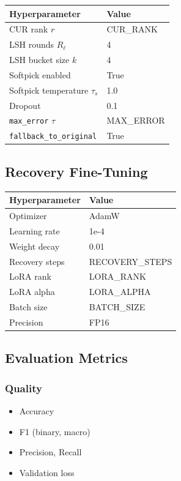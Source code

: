 \begin{table}[H]
\centering
\small
\begin{tabular}{ll}
\toprule
\textbf{Hyperparameter} & \textbf{Value} \\
\midrule
CUR rank $r$ & {{CUR\_RANK}} \\
LSH rounds $R_\ell$ & 4 \\
LSH bucket size $k$ & 4 \\
Softpick enabled & True \\
Softpick temperature $\tau_s$ & 1.0 \\
Dropout & 0.1 \\
\texttt{max\_error} $\tau$ & {{MAX\_ERROR}} \\
\texttt{fallback\_to\_original} & True \\
\bottomrule
\end{tabular}
\end{table}

\subsection{Recovery Fine-Tuning}

\begin{table}[H]
\centering
\small
\begin{tabular}{ll}
\toprule
\textbf{Hyperparameter} & \textbf{Value} \\
\midrule
Optimizer & AdamW \\
Learning rate & 1e-4 \\
Weight decay & 0.01 \\
Recovery steps & {{RECOVERY\_STEPS}} \\
LoRA rank & {{LORA\_RANK}} \\
LoRA alpha & {{LORA\_ALPHA}} \\
Batch size & {{BATCH\_SIZE}} \\
Precision & FP16 \\
\bottomrule
\end{tabular}
\end{table}

\subsection{Evaluation Metrics}

\subsubsection{Quality}
\begin{itemize}
\item Accuracy
\item F1 (binary, macro)
\item Precision, Recall
\item Validation loss

\end{itemize}
